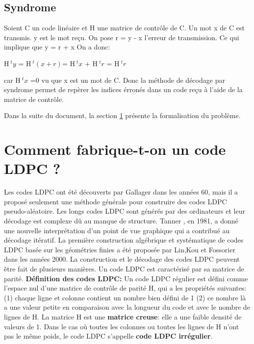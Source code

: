 \documentclass[french,nochapter,11pt]{rapportUB}
\begin{document}
\subsection{Syndrome}
Soient C un code linéaire et H une matrice de contrôle de C. Un mot x de C est transmis. y est le mot reçu. \newline
On pose r = y - x l'erreur de transmission. Ce qui implique que y = r + x \newline
On a donc:
\begin{tabbing}
  \hspace{5cm} H$~^ty$ = H$~^t(x + r)$= H$~^tx$ + H$~^tr$  = H$~^tr$ 
\end{tabbing}
car H$~^tx$ =0 vu que x est un mot de C.
Donc la méthode de décodage par syndrome permet de repèrer les indices érronés dans un code reçu à l'aide de la matrice de contrôle.

\vspace{0.8cm}
Dans la suite du document, la section \ref{sec:fabrication} présente la formalisation du problème.


\section{Comment fabrique-t-on un code LDPC ?}
\label{sec:fabrication}
Les codes LDPC ont été découverts par Gallager dans les années 60, mais il a proposé seulement une méthode générale pour construire des codes LDPC pseudo-aléatoire. \newline
Les longs codes LDPC sont générés par des ordinateurs et leur décodage est complexe dû au manque de structure. Tanner , en 1981, a donné une nouvelle interprétation d'un point de vue graphique qui a contribué au décodage itératif. \newline
La première construction algébrique et systématique de codes LDPC basée sur les géométries finies a été proposée par Lin,Kou et Fossorier dans les années 2000. \newline
La construction et le décodage des codes LDPC peuvent être fait de plusieurs manières. Un code LDPC est caractérisé par sa matrice de parité. \newline
\textbf{Définition des codes LDPC:} Un code LDPC régulier est défini comme l'espace nul d'une matrice de contrôle de parité H, qui a les propriétés suivantes: \newline
(1) chaque ligne et colonne contient un nombre bien défini de 1
(2) ce nombre là a une valeur petite en comparaison avec la longueur du code et avec le nombre de lignes de H. \newline
La matrice H est une \textbf{matrice creuse}: elle a une faible densité de valeurs de 1. \newline
Dans le cas où toutes les colonnes ou toutes les lignes de H n'ont pas le même poids, le code LDPC s'appelle \textbf{code LDPC irrégulier}. \newline
\end{document}

